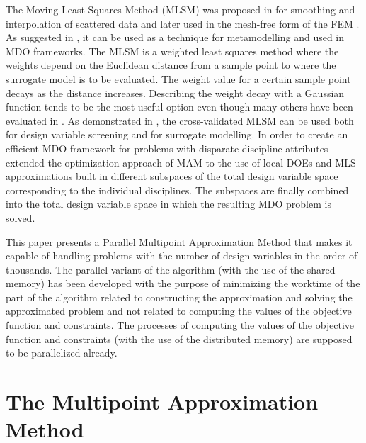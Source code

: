\documentclass[runningheads,a4paper]{llncs}
\begin{document}
The Moving Least Squares Method (MLSM) was proposed in \cite{LancasterSalkauskas1981} for smoothing and interpolation of scattered data and later used in the mesh-free form of the FEM \cite{Liszka1984}. As suggested in \cite{ChoiYounYang2001}, it can be used as a technique for metamodelling and used in MDO frameworks. The MLSM is a weighted least squares method where the weights depend on the Euclidean distance from a sample point to where the surrogate model is to be evaluated. The weight value for a certain sample point decays as the distance increases. Describing the weight decay with a Gaussian function tends to be the most useful option even though many others have been evaluated in \cite{ToropovSchrammSahaiJones2005}. As demonstrated in \cite{PolynkinToropov2010}, the cross-validated MLSM can be used both for design variable screening and for surrogate modelling. In order to create an efficient MDO framework for problems with disparate discipline attributes \cite{OllarToropovJones2014} extended the optimization approach of MAM to the use of local DOEs and MLS approximations built in different subspaces of the total design variable space corresponding to the individual disciplines. The subspaces are finally combined into the total design variable space in which the resulting MDO problem is solved.

This paper presents a Parallel Multipoint Approximation Method that makes it capable of handling problems with the number of design variables in the order of thousands. The parallel variant of the algorithm (with the use of the shared memory) has been developed with the purpose of minimizing the worktime of the part of the algorithm related to constructing the approximation and solving the approximated problem and not related to computing the values of the objective function and  constraints. The processes of computing the values of the objective function and constraints (with the use of the 
distributed memory) are supposed to be parallelized already.

\section{The Multipoint Approximation Method}
\label{sec:MAM}
\end{document}
